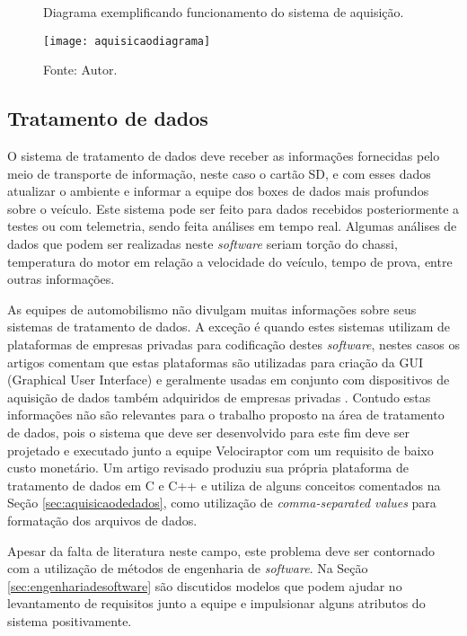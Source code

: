 \begin{figure}[!htb]
	\centering
		\caption{Diagrama exemplificando funcionamento do sistema de aquisição.}
		\texttt{[image: aquisicaodiagrama]} 
		\caption*{Fonte: Autor.}
		\label{fig:aquisicaodiagrama}
\end{figure} 


\subsection{Tratamento de dados}

O sistema de tratamento de dados deve receber as informações fornecidas pelo meio de transporte de informação, neste caso o cartão SD, e com esses dados atualizar o ambiente e informar a equipe dos boxes de dados mais profundos sobre o veículo. Este sistema pode ser feito para dados recebidos posteriormente a testes ou com telemetria, sendo feita análises em tempo real. Algumas análises de dados que podem ser realizadas neste \textit{software} seriam torção do chassi, temperatura do motor em relação a velocidade do veículo, tempo de prova, entre outras informações. 

As equipes de automobilismo não divulgam muitas informações sobre seus sistemas de tratamento de dados. A exceção é quando estes sistemas utilizam de plataformas de empresas privadas para codificação destes \textit{software}, nestes casos os artigos comentam que estas plataformas são utilizadas para criação da GUI (Graphical User Interface) e geralmente usadas em conjunto com dispositivos de aquisição de dados também adquiridos de empresas privadas \cite{applicationOfData2010}\cite{vehicleDataAcquisition2014}\cite{designAndImplementation2015}\cite{developmentOfAn2016}. Contudo estas informações não são relevantes para o trabalho proposto na área de tratamento de dados, pois o sistema que deve ser desenvolvido para este fim deve ser projetado e executado junto a equipe Velociraptor com um requisito de baixo custo monetário. Um artigo revisado produziu sua própria plataforma de tratamento de dados em C e C++ \cite{racecarInstrumentationFor2012} e utiliza de alguns conceitos comentados na Seção \ref{sec:aquisicaodedados}, como utilização de \textit{comma-separated values} para formatação dos arquivos de dados. 

Apesar da falta de literatura neste campo, este problema deve ser contornado com a utilização de métodos de engenharia de \textit{software}. Na Seção \ref{sec:engenhariadesoftware} são discutidos modelos que podem ajudar no levantamento de requisitos junto a equipe e impulsionar alguns atributos do sistema positivamente. 

